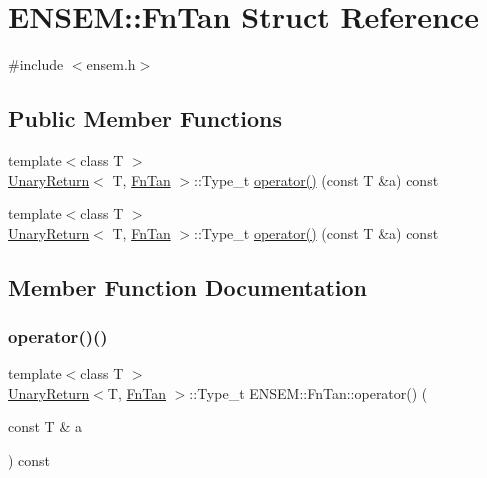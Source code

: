 \hypertarget{structENSEM_1_1FnTan}{}\section{E\+N\+S\+EM\+:\+:Fn\+Tan Struct Reference}
\label{structENSEM_1_1FnTan}


{\ttfamily \#include $<$ensem.\+h$>$}

\subsection*{Public Member Functions}
\begin{DoxyCompactItemize}
\item 
{\footnotesize template$<$class T $>$ }\\\mbox{\hyperlink{structENSEM_1_1UnaryReturn}{Unary\+Return}}$<$ T, \mbox{\hyperlink{structENSEM_1_1FnTan}{Fn\+Tan}} $>$\+::Type\+\_\+t \mbox{\hyperlink{structENSEM_1_1FnTan_ac94aaabe2436b8699faf802a7365e342}{operator()}} (const T \&a) const
\item 
{\footnotesize template$<$class T $>$ }\\\mbox{\hyperlink{structENSEM_1_1UnaryReturn}{Unary\+Return}}$<$ T, \mbox{\hyperlink{structENSEM_1_1FnTan}{Fn\+Tan}} $>$\+::Type\+\_\+t \mbox{\hyperlink{structENSEM_1_1FnTan_ac94aaabe2436b8699faf802a7365e342}{operator()}} (const T \&a) const
\end{DoxyCompactItemize}


\subsection{Member Function Documentation}
\mbox{\label{structENSEM_1_1FnTan_ac94aaabe2436b8699faf802a7365e342}} 
\subsubsection{\texorpdfstring{operator()()}{operator()()}\hspace{0.1cm}{\footnotesize\ttfamily [1/2]}}
{\footnotesize\ttfamily template$<$class T $>$ \\
\mbox{\hyperlink{structENSEM_1_1UnaryReturn}{Unary\+Return}}$<$T, \mbox{\hyperlink{structENSEM_1_1FnTan}{Fn\+Tan}} $>$\+::Type\+\_\+t E\+N\+S\+E\+M\+::\+Fn\+Tan\+::operator() (\begin{DoxyParamCaption}\item[{const T \&}]{a }\end{DoxyParamCaption}) const\hspace{0.3cm}{\ttfamily [inline]}}


